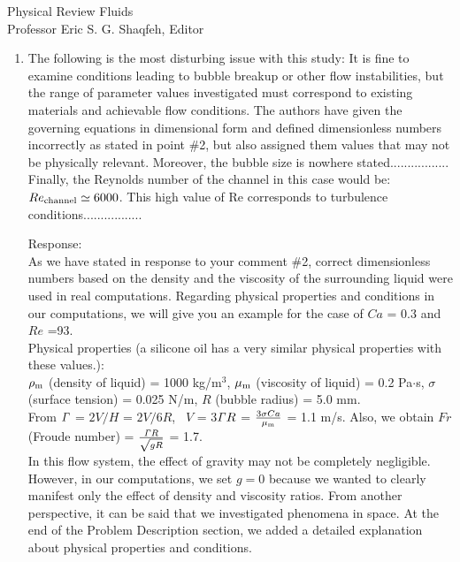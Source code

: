 \documentclass{letter}
\begin{document}
\begin{letter}{
Physical Review Fluids\\
Professor Eric S. G. Shaqfeh, Editor\\}
\begin{enumerate}
\par\noindent
\item
\textsf
{The following is the most disturbing issue with this study: It is fine to
examine conditions leading to bubble breakup or other flow instabilities, but
the range of parameter values investigated must correspond to existing
materials and achievable flow conditions.  The authors have given the governing
equations in dimensional form and defined dimensionless numbers incorrectly as
stated in point \#2, but also assigned them values that may not be physically
relevant. Moreover, the bubble size is nowhere stated.................\\
Finally, the Reynolds number of the channel in this case would be: $Re_{\rm
channel} \simeq 6000$.  This high value of Re corresponds to turbulence
conditions.................}
\vspace{3 mm}

Response: \\
As we have stated in response to your comment \#2, correct dimensionless
numbers based on the density and the viscosity of the surrounding liquid were
used in real computations.  Regarding physical properties and conditions in our
computations, we will give you an example for the case of $Ca$ = 0.3 and $Re$
=93.\\

Physical properties (a silicone oil has a very similar physical properties with these values.):\\
\quad $\rho_{\rm m}$ (density of liquid) = 1000 kg/m$^3$, $\mu_{\rm m}$ (viscosity of liquid) = 0.2 Pa$\cdot$s,
$\sigma$ (surface tension) = 0.025 N/m, $R$ (bubble radius) = 5.0 mm.\\
From ${\it \Gamma}$ = $2V/H$ = $2V/6R$, \  $V$ = 3${\it \Gamma} R$ = $\frac{3\sigma Ca}{\mu_{\rm m}} $ = 1.1 m/s.
Also, we obtain $Fr$ (Froude number) = $\frac{{\it \Gamma}R}{\sqrt {gR}}$ = 1.7. \\
In this flow system, the effect of gravity may not be completely negligible. However, in our computations, 
we set $g = 0$ because we wanted to clearly manifest only the effect of density and viscosity ratios. 
From another perspective, it can be said that we investigated phenomena in space.
At the end of the Problem Description section, we added a detailed explanation about physical properties and conditions.


\end{enumerate}
\end{letter}
\end{document}
